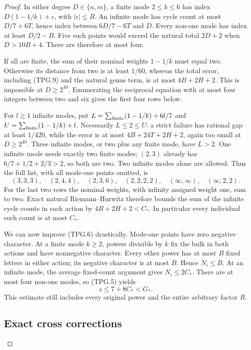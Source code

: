 \begin{proof}
In either degree \(D\in\{n,m\}\), a finite mode
\(2\le k\le6\) has index
\(D(1-1/k)+\epsilon\), with \(|\epsilon|\le B\).
An infinite mode has cycle count at most \(D/7+6T\), hence
index between \(6D/7-6T\) and \(D\).
Every non-one mode has index at least \(D/2-B\).
Five such points would exceed the natural total \(2D+2\)
when \(D>10B+4\).  There are therefore at most four.

If all are finite, the sum of their nominal weights
\(1-1/k\) must equal two.  Otherwise its distance from two
is at least \(1/60\), whereas the total error, including
(TPG.9) and the natural genus term, is at most
\(4B+2H+2\).  This is impossible at \(D\ge2^{40}\).
Enumerating the reciprocal equation with at most four
integers between two and six gives the first four rows below.

For \(l\ge1\) infinite modes, put
\(L=\sum_{\rm finite}(1-1/k)+6l/7\) and
\(U=\sum_{\rm finite}(1-1/k)+l\).
Necessarily \(L\le2\le U\): a strict failure has rational
gap at least \(1/420\), while the error is at most
\(4B+24T+2H+2\), again too small at \(D\ge2^{40}\).
Three infinite modes, or two plus any finite mode, have
\(L>2\).  One infinite mode needs exactly two finite modes;
\((2,3)\) already has \(6/7+1/2+2/3>2\), so both are
two.  Two infinite modes alone are allowed.  Thus the full
list, with all mode-one points omitted, is
\[
 (3,3,3),\quad(2,4,4),\quad(2,3,6),\quad(2,2,2,2),
 \quad(\infty,\infty),\quad(\infty,2,2).
 \tag{TPG.10}
\]
For the last two rows the nominal weights, with infinity
assigned weight one, sum to two.  Exact natural
Riemann--Hurwitz therefore bounds the sum of the infinite
cycle counts in each action by
\(4B+2H+2<C_*\).  In particular every individual such
count is at most \(C_*\).

We can now improve (TPG.6) drastically.  Mode-one points
have zero negative character.  At a finite mode \(k\ge2\),
powers divisible by \(k\) fix the bulk in both actions and
have nonnegative character.  Every other power has at most
\(B\) fixed letters in either action; its negative character
is at most \(B\).  Hence \(N_i\le B\).
At an infinite mode, the average fixed-count argument gives
\(N_i\le2C_*\).  There are at most four non-one modes, so
(TPG.5) yields
\[
                   z\le7+8C_*<G_*.
 \tag{TPG.11}
\]
This estimate still includes every original power and the
entire arbitrary factor \(R\).

\subsection*{Exact cross corrections}


\end{proof}
